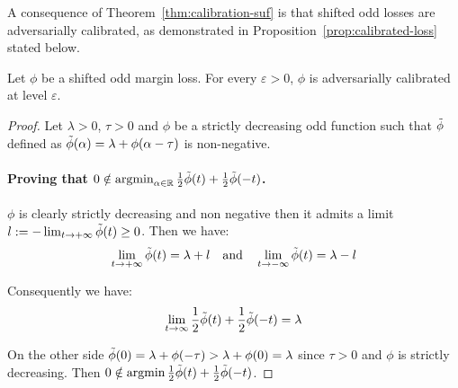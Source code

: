 A consequence of Theorem~\ref{thm:calibration-suf} is that shifted odd losses are adversarially calibrated, as demonstrated in Proposition~\ref{prop:calibrated-loss} stated below.

\begin{prop}
\label{prop:calibrated-loss}
Let $\phi$ be a shifted odd margin loss. For every $\varepsilon>0$, ${\phi}$ is adversarially calibrated at level $\varepsilon$.
\end{prop}


\begin{proof}
    Let $\lambda>0$, $\tau>0$ and $\phi$ be a strictly decreasing odd function such that $\Tilde{\phi}$ defined as  $\Tilde{\phi}(\alpha) = \lambda +\phi(\alpha-\tau)$ is non-negative. 
    
    \paragraph{Proving that $0\notin\operatorname*{argmin}_{\alpha\in\mathbb{R}}\frac12\Tilde{\phi}(t)+\frac12 \Tilde{\phi}(-t)$.}${\phi}$ is clearly strictly decreasing and non negative then it admits a limit $l:=-\lim_{t\to+\infty}\Tilde{\phi}(t)\geq0$. Then we have:
    \begin{align*}
        \lim_{t\to+\infty}\Tilde{\phi}(t) = \lambda+l\quad\text{and}\quad\lim_{t\to-\infty}\Tilde{\phi}(t) = \lambda-l
    \end{align*}
    
    Consequently we have:
    \begin{align*}
        \lim_{t\to\infty}\frac12\Tilde{\phi}(t)+\frac12 \Tilde{\phi}(-t)= \lambda
    \end{align*}
    
    On the other side $\Tilde{\phi}(0)= \lambda + \phi(-\tau) >\lambda +\phi(0) =\lambda$ since $\tau>0$ and $\phi$ is strictly decreasing. Then $0\notin \operatorname*{argmin}\frac12\Tilde{\phi}(t)+\frac12 \Tilde{\phi}(-t)$.
    
    

\end{proof}
